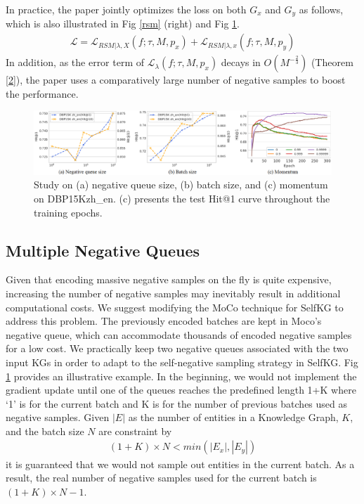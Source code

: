 \documentclass[sigconf]{acmart}
\begin{document}
{\begin{figure}
    \label{3}
\end{figure}
In practice, the paper jointly optimizes the loss on both $G_x$ and $G_y$ as follows, which is also illustrated in Fig \ref{rsm} (right) and Fig \ref{3}.
\begin{gather}\label{eq5}
    \mathcal{L} = \mathcal{L}_{RSM|\lambda ,X}(f;\tau ,M,p_x) + \mathcal{L}_{RSM|\lambda ,x}(f;\tau ,M,p_y)
\end{gather}
In addition, as the error term of $\mathcal{L}_{\lambda}(f;\tau,M,p_x)$ decays in $O(M^{-\frac{2}{3}})$ (Theorem \ref{2}), the paper uses a comparatively large number of negative samples to boost the performance.
\begin{figure}[h]
  \includegraphics[width=\textwidth]{figure/study.png}
  \caption{Study on (a) negative queue size, (b) batch size, and (c) momentum on DBP15Kzh\_en. (c) presents the test Hit@1 curve throughout the training epochs. \cite{DBLP:journals/corr/abs-2203-01044}}
  \label{study}
\end{figure}
\subsection{Multiple Negative Queues}
Given that encoding massive negative samples on the fly is quite expensive, increasing the number of negative samples may inevitably result in additional computational costs. We suggest modifying the MoCo technique \cite{he2020momentum} for SelfKG to address this problem. The previously encoded batches are kept in Moco's negative queue, which can accommodate thousands of encoded negative samples for a low cost. We practically keep two negative queues associated with the two input KGs in order to adapt to the self-negative sampling strategy in SelfKG. Fig \ref{3} provides an illustrative example. In the beginning, we would not implement the gradient update until one of the queues reaches the predefined length 1+K where ‘1’ is for the current batch and K is for the number of previous batches used as negative samples. Given $|E|$ as the number of entities in a Knowledge Graph, $K$, and the batch size $N$ are constraint by
\begin{gather}
    (1+K)\times N < min(|E_x|,|E_y|)
\end{gather}
it is guaranteed that we would not sample out entities in the current batch. As a result, the real number of negative samples used for the current batch is $(1+K) \times N-1$.

}
\end{document}
